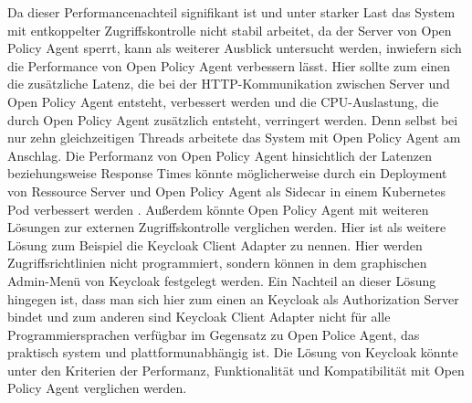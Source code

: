 Da dieser Performancenachteil signifikant ist und unter starker Last das System mit entkoppelter Zugriffskontrolle nicht stabil arbeitet, da der Server von Open Policy Agent sperrt, kann als weiterer Ausblick untersucht werden, inwiefern sich die Performance von Open Policy Agent verbessern lässt. Hier sollte zum einen die zusätzliche Latenz, die bei der HTTP-Kommunikation zwischen Server und Open Policy Agent entsteht, verbessert werden und die CPU-Auslastung, die durch Open Policy Agent zusätzlich entsteht, verringert werden. Denn selbst bei nur zehn gleichzeitigen Threads arbeitete das System mit Open Policy Agent am Anschlag. Die Performanz von Open Policy Agent hinsichtlich der Latenzen beziehungsweise Response Times könnte möglicherweise durch ein Deployment von Ressource Server und Open Policy Agent als Sidecar in einem Kubernetes Pod verbessert werden \citep{sidecar:2017}. Außerdem könnte Open Policy Agent mit weiteren Lösungen zur externen Zugriffskontrolle verglichen werden. Hier ist als weitere Lösung zum Beispiel die Keycloak Client Adapter zu nennen. Hier werden Zugriffsrichtlinien nicht programmiert, sondern können in dem graphischen Admin-Menü von Keycloak festgelegt werden. Ein Nachteil an dieser Lösung hingegen ist, dass man sich hier zum einen an Keycloak als Authorization Server bindet und zum anderen sind Keycloak Client Adapter nicht für alle Programmiersprachen verfügbar im Gegensatz zu Open Police Agent, das praktisch system und plattformunabhängig ist. Die Lösung von Keycloak könnte unter den Kriterien der Performanz, Funktionalität und Kompatibilität mit Open Policy Agent verglichen werden.

